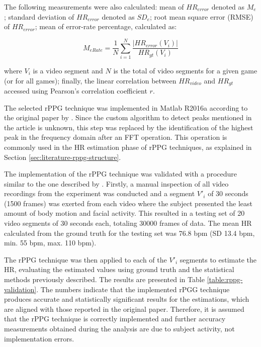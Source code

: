 The following measurements were also calculated: mean of $HR_{error}$ denoted as $M_e$; standard deviation of $HR_{error}$ denoted as $SD_e$; root mean square error (RMSE) of $HR_{error}$; mean of error-rate percentage, calculated as:

\begin{equation}
\label{eqn:merate}
M_{eRate} = \frac{1}{N} \sum_{i=1}^{N}\frac{|HR_{error}(V_i)|}{HR_{gt}(V_i)}
\end{equation}

where $V_i$ is a video segment and $N$ is the total of video segments for a given game (or for all games); finally, the linear correlation between $HR_{video}$ and $HR_{gt}$ accessed using Pearson's correlation coefficient $r$.


The selected rPPG technique was implemented in Matlab R2016a according to the original paper by \textcite{poh2011advancements}. Since the custom algorithm to detect peaks mentioned in the article is unknown, this step was replaced by the identification of the highest peak in the frequency domain after an FFT operation. This operation is commonly used in the HR estimation phase of rPPG techniques, as explained in Section \ref{sec:literature-rppg-structure}.

The implementation of the rPPG technique was validated with a procedure similar to the one described by \textcite{li2014remote}. Firstly, a manual inspection of all video recordings from the experiment was conducted and a segment $V'_i$ of 30 seconds (1500 frames) was exerted from each video where the subject presented the least amount of body motion and facial activity. This resulted in a testing set of 20 video segments of 30 seconds each, totaling 30000 frames of data. The mean HR calculated from the ground truth for the testing set was 76.8 bpm (SD 13.4 bpm, min. 55 bpm, max. 110 bpm).

The rPPG technique was then applied to each of the $V'_i$ segments to estimate the HR, evaluating the estimated values using ground truth and the statistical methods previously described. The results are presented in Table \ref{table:rppg-validation}. The numbers indicate that the implemented rPGG technique produces accurate and statistically significant results for the estimations, which are aligned with those reported in the original paper. Therefore, it is assumed that the rPPG technique is correctly implemented and further accuracy measurements obtained during the analysis are due to subject activity, not implementation errors.

